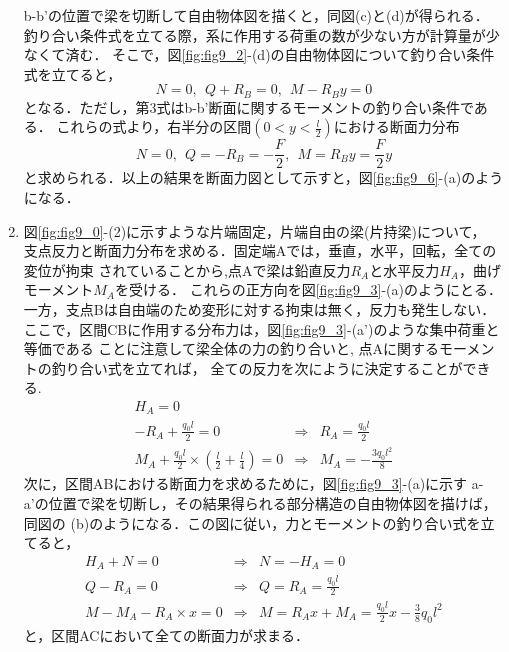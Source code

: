 \documentclass[10pt,a4j]{jbook}
\begin{document}
\begin{enumerate}
b-b'の位置で梁を切断して自由物体図を描くと，同図(c)と(d)が得られる．
釣り合い条件式を立てる際，系に作用する荷重の数が少ない方が計算量が少なくて済む．
そこで，図\ref{fig:fig9_2}-(d)の自由物体図について釣り合い条件式を立てると，
\begin{equation}
	N=0, \ \ Q+R_B=0, \ \ M-R_By=0
	\label{eqn:}
\end{equation}
となる．ただし，第3式はb-b'断面に関するモーメントの釣り合い条件である．
これらの式より，右半分の区間$\left(0<y<\frac{l}{2}\right)$における断面力分布
\begin{equation}
	N=0, \ \ Q=-R_B=-\frac{F}{2}, \ \ M=R_By =\frac{F}{2}y
	\label{eqn:}
\end{equation}
と求められる．以上の結果を断面力図として示すと，図\ref{fig:fig9_6}-(a)のようになる．
\item
図\ref{fig:fig9_0}-(2)に示すような片端固定，片端自由の梁(片持梁)について，
支点反力と断面力分布を求める．固定端Aでは，垂直，水平，回転，全ての変位が拘束
されていることから,点Aで梁は鉛直反力$R_A$と水平反力$H_A$，曲げモーメント$M_A$を受ける．
これらの正方向を図\ref{fig:fig9_3}-(a)のようにとる．
一方，支点Bは自由端のため変形に対する拘束は無く，反力も発生しない．
ここで，区間CBに作用する分布力は，図\ref{fig:fig9_3}-(a')のような集中荷重と等価である
ことに注意して梁全体の力の釣り合いと, 点Aに関するモーメントの釣り合い式を立てれば，
全ての反力を次にように決定することができる.
\begin{eqnarray}
	H_A=0 & &  \\
	-R_A+\frac{q_0l}{2}=0 &\Rightarrow & R_A=\frac{q_0l}{2} \\
	M_A+\frac{q_0l}{2}\times \left(\frac{l}{2}+\frac{l}{4}\right)=0
	& \Rightarrow & M_A=-\frac{3q_0l^2}{8}
\end{eqnarray}
次に，区間ABにおける断面力を求めるために，図\ref{fig:fig9_3}-(a)に示す
a-a'の位置で梁を切断し，その結果得られる部分構造の自由物体図を描けば，同図の
(b)のようになる．この図に従い，力とモーメントの釣り合い式を立てると，
\begin{eqnarray}
	H_A+N=0 
	& \Rightarrow & 
	N=-H_A=0
	\label{eqn:} \\
	Q-R_A=0 
	& \Rightarrow & 
	Q=R_A=\frac{q_0l}{2}
	\label{eqn:} \\
	M-M_A-R_A\times x =0 
	& \Rightarrow & 
	M=R_Ax+M_A= \frac{q_0l}{2}x-\frac{3}{8}q_0l^2 
	\label{eqn:}
\end{eqnarray}
と，区間ACにおいて全ての断面力が求まる．


\end{enumerate}
\end{document}
